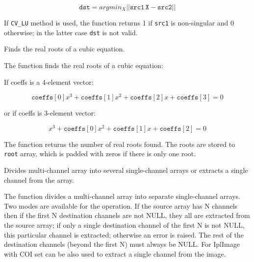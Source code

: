 \[
\texttt{dst} = argmin_X||\texttt{src1} \, \texttt{X} - \texttt{src2}||
\]

If \texttt{CV\_LU} method is used, the function returns 1 if \texttt{src1} is non-singular and 0 otherwise; in the latter case \texttt{dst} is not valid.

Finds the real roots of a cubic equation.


\begin{description}
\end{description}

The function finds the real roots of a cubic equation:

If coeffs is a 4-element vector:

\[
\texttt{coeffs}[0] x^3 + \texttt{coeffs}[1] x^2 + \texttt{coeffs}[2] x + \texttt{coeffs}[3] = 0
\]

or if coeffs is 3-element vector:

\[
x^3 + \texttt{coeffs}[0] x^2 + \texttt{coeffs}[1] x + \texttt{coeffs}[2] = 0
\]

The function returns the number of real roots found. The roots are
stored to \texttt{root} array, which is padded with zeros if there is
only one root.

Divides multi-channel array into several single-channel arrays or extracts a single channel from the array.


\begin{description}
\end{description}

The function divides a multi-channel array into separate
single-channel arrays. Two modes are available for the operation. If the
source array has N channels then if the first N destination channels
are not NULL, they all are extracted from the source array;
if only a single destination channel of the first N is not NULL, this
particular channel is extracted; otherwise an error is raised. The rest
of the destination channels (beyond the first N) must always be NULL. For
IplImage  with COI set can be also used to extract a single
channel from the image.


